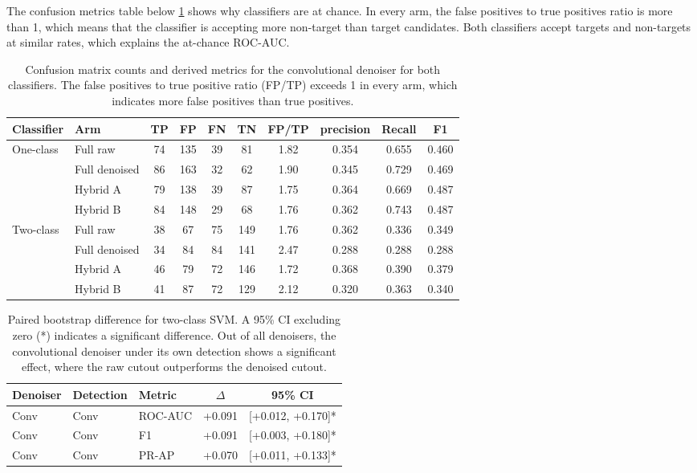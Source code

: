 \documentclass[ %
                    author={Daniel Page},
                supervisor={Dr. Andrew Calway},
                    degree={MSc},
                     title={Some Structural Guidelines for Data Science MSc Theses, Including Those With Long Titles that Run Across Multiple Lines on the Front Page},
                  subtitle={And those including an optional subtitle too, for good measure},
                      type={},
                      year={2021}]{dissertation}
\begin{document}
The confusion metrics table below \ref{tab:confusion} shows why classifiers are at chance. In every arm, the false positives to true positives ratio is more than 1, which means that the classifier is accepting more non-target than target candidates. Both classifiers accept targets and non-targets at similar rates, which explains the at-chance ROC-AUC. 
\begin{table}[htbp]
    \centering
    \begin{tabular}{llcccccccc}
    \toprule
    Classifier & Arm & TP & FP & FN & TN & FP/TP & precision & Recall & F1 \\
    \midrule
    \multirow{4}{*}{One-class}
    & Full raw & 74 & 135 & 39 & 81 & 1.82 & 0.354 & 0.655 & 0.460 \\
    & Full denoised & 86 & 163 & 32 & 62 & 1.90 & 0.345 & 0.729 & 0.469 \\
    & Hybrid A & 79 & 138 & 39 & 87 & 1.75 & 0.364 & 0.669 & 0.487 \\
    & Hybrid B & 84 & 148 & 29 & 68 & 1.76 & 0.362 & 0.743 & 0.487 \\
    \midrule
    \multirow{4}{*}{Two-class}
    & Full raw & 38 & 67 & 75 & 149 & 1.76 & 0.362 & 0.336 & 0.349 \\
    & Full denoised & 34 & 84 & 84 & 141 & 2.47 & 0.288 & 0.288 & 0.288 \\
    & Hybrid A & 46 & 79 & 72 & 146 & 1.72 & 0.368 & 0.390 & 0.379 \\
    & Hybrid B & 41 & 87 & 72 & 129 & 2.12 & 0.320 & 0.363 & 0.340 \\
    \bottomrule
    \end{tabular}
    \caption{Confusion matrix counts and derived metrics for the convolutional denoiser for both classifiers. The false positives to true positive ratio (FP/TP) exceeds 1 in every arm, which indicates more false positives than true positives.}
    \label{tab:confusion}
\end{table}

\begin{table}[H]
    \centering
    \small
    \begin{tabular}{lllcc}
    \toprule
    Denoiser & Detection & Metric & $\Delta$ & 95\% CI\\
    \midrule
    Conv & Conv & ROC-AUC & +0.091 & [+0.012, +0.170]* \\
    Conv & Conv & F1 & +0.091 & [+0.003, +0.180]* \\
    Conv & Conv & PR-AP & +0.070 & [+0.011, +0.133]* \\
    \bottomrule
    \end{tabular}
    \caption{Paired bootstrap difference for two-class SVM. A 95\% CI excluding zero (*) indicates a significant difference. Out of all denoisers, the convolutional denoiser under its own detection shows a significant effect, where the raw cutout outperforms the denoised cutout.}
    \label{tab:Paired-twoclass}
\end{table}
\end{document}
